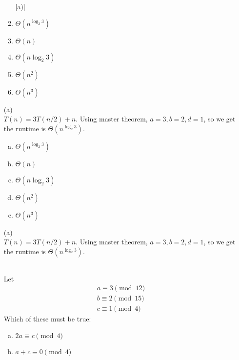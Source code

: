 \begin{solution}
\begin{enumerate}[(a)]
\begin{enumerate} [a)]
    \item $\Theta (n^{\log_2 3})$ 
    \item $\Theta (n)$
    \item $\Theta (n \log_2 3) $
    \item $\Theta (n^2)$
    \item $\Theta (n^3)$
\end{enumerate}

\begin{solution}
(a) \\
$T(n) = 3T(n/2) + n$. Using master theorem, $a = 3, b=2, d=1$, so we get the runtime is $\Theta (n^{\log_2 3})$.
\end{solution}

\newpage\begin{enumerate}[(a)]
	\item  $\Theta (n^{\log_2 3})$ 
    
	\item  $\Theta (n)$
    
	\item  $\Theta (n \log_2 3) $
    
	\item  $\Theta (n^2)$
    
	\item  $\Theta (n^3)$

\end{enumerate}
\begin{solution}

(a) \\
$T(n) = 3T(n/2) + n$. Using master theorem, $a = 3, b=2, d=1$, so we get the runtime is $\Theta (n^{\log_2 3})$.

\end{solution}
\\
Let 
\begin{align*}
    a \equiv 3 \pmod{12}\\
    b \equiv 2 \pmod{15}\\
    c \equiv 1 \pmod{4}
\end{align*}
Which of these must be true:
\begin{enumerate}[(a)]
	\item  $2a \equiv c \pmod{4}$

	\item  $a + c \equiv 0 \pmod{4}$


\end{enumerate}
\end{enumerate}
\end{solution}
